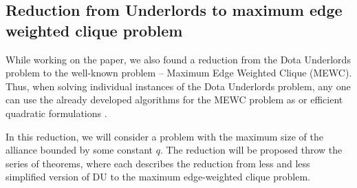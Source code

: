 \documentclass{article}
\begin{document}
\subsection{Reduction from Underlords to maximum edge weighted clique problem}
While working on the paper, we also found a reduction from the Dota Underlords problem to the well-known problem -- Maximum Edge Weighted Clique (MEWC). Thus, when solving individual instances of the Dota Underlords problem, any one can use the already developed algorithms for the MEWC problem as \cite{san2019new} or efficient quadratic formulations    \cite{hosseinian2017maximum}.

In this reduction, we will consider a problem with the maximum size of the alliance bounded by some constant $q$. The reduction will be proposed throw the series of theorems, where each describes the reduction from less and  less simplified version of DU to the maximum edge-weighted clique problem.
\end{document}
